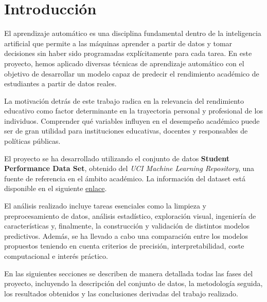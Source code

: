 \documentclass[11pt,a4paper]{article}
\begin{document}
\newpage
\large
\tableofcontents
\thispagestyle{empty}
\newpage
\normalsize

\cleardoublepage
{}
\setcounter{page}{1}
\fancyfoot[C]{\raisebox{-10pt}{\thepage}}


\section{Introducción}

El aprendizaje automático es una disciplina fundamental dentro de la inteligencia artificial que permite a las máquinas aprender a partir de datos y tomar decisiones sin haber sido programadas explícitamente para cada tarea. En este proyecto, hemos aplicado diversas técnicas de aprendizaje automático con el objetivo de desarrollar un modelo capaz de predecir el rendimiento académico de estudiantes a partir de datos reales.

\medskip

La motivación detrás de este trabajo radica en la relevancia del rendimiento educativo como factor determinante en la trayectoria personal y profesional de los individuos. Comprender qué variables influyen en el desempeño académico puede ser de gran utilidad para instituciones educativas, docentes y responsables de políticas públicas.

\medskip

El proyecto se ha desarrollado utilizando el conjunto de datos \textbf{Student Performance Data Set}, obtenido del \textit{UCI Machine Learning Repository}, una fuente de referencia en el ámbito académico. La información del dataset está disponible en el siguiente \href{https://archive.ics.uci.edu/ml/datasets/student+performance}{\textcolor{linkblue}{enlace}}. 

\medskip

El análisis realizado incluye tareas esenciales como la limpieza y preprocesamiento de datos, análisis estadístico, exploración visual, ingeniería de características y, finalmente, la construcción y validación de distintos modelos predictivos. Además, se ha llevado a cabo una comparación entre los modelos propuestos teniendo en cuenta criterios de precisión, interpretabilidad, coste computacional e interés práctico.

\medskip

En las siguientes secciones se describen de manera detallada todas las fases del proyecto, incluyendo la descripción del conjunto de datos, la metodología seguida, los resultados obtenidos y las conclusiones derivadas del trabajo realizado.
\end{document}
